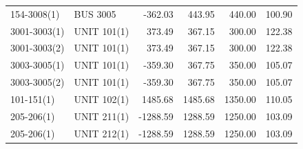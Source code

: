 \documentclass[10pt]{report}
\begin{document}
\begin{table}[H]
{\begin{tabular}{llrrrr}
154-3008(1) & BUS 3005 & -362.03 & 443.95 & 440.00 & 100.90 \\
3001-3003(1) & UNIT 101(1) & 373.49 & 367.15 & 300.00 & 122.38 \\
3001-3003(2) & UNIT 101(1) & 373.49 & 367.15 & 300.00 & 122.38 \\
3003-3005(1) & UNIT 101(1) & -359.30 & 367.75 & 350.00 & 105.07 \\
3003-3005(2) & UNIT 101(1) & -359.30 & 367.75 & 350.00 & 105.07 \\
101-151(1) & UNIT 102(1) & 1485.68 & 1485.68 & 1350.00 & 110.05 \\
205-206(1) & UNIT 211(1) & -1288.59 & 1288.59 & 1250.00 & 103.09 \\
205-206(1) & UNIT 212(1) & -1288.59 & 1288.59 & 1250.00 & 103.09 \\
\bottomrule
\end{tabular}}
\end{table}
\end{document}
